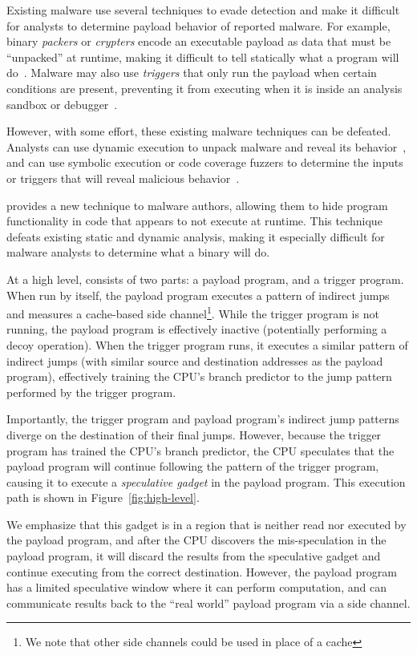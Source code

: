 Existing malware use several techniques to evade detection and
make it difficult for analysts to determine payload behavior of reported malware. 
For example, binary \emph{packers} or \emph{crypters} encode an executable payload as
data that must be ``unpacked'' at runtime, making it difficult to tell
statically what a program will do~\cite{malware-packers}. Malware may also use
\emph{triggers} that only run the payload when certain conditions are present, preventing
it from executing when it is inside an analysis sandbox or 
debugger~\cite{balzarotti2010efficient,red-pill}.

However, with some effort, these existing malware techniques can be defeated.
Analysts can use
dynamic execution to unpack malware and reveal its
behavior~\cite{balzarotti2010efficient}, and can use symbolic execution or code
coverage fuzzers to determine the inputs or triggers that will reveal malicious
behavior~\cite{moser2007exploring,schwartz2010all,wang2017angr,egele2012survey}.


\speculake provides a new technique to malware authors, allowing them to hide
program functionality in code that appears to not execute at runtime. This technique
defeats existing static and dynamic analysis, making it especially difficult for
malware analysts to determine what a binary will do.


At a high level, \speculake consists of two parts: a payload program, and a
trigger program. When run by itself, the payload program executes a pattern of
indirect jumps and measures a cache-based side channel\footnote{We note that other
side channels could be used in place of a cache}. While the trigger program is
not running, the payload program is effectively inactive (potentially performing
a decoy operation). When the trigger program runs, it executes a similar
pattern of indirect jumps (with similar source and destination addresses as the
payload program), effectively training the CPU's branch predictor to the jump
pattern performed by the trigger program.

Importantly, the trigger program and payload program's indirect jump patterns
diverge on the destination of their final jumps. However, because the trigger
program has trained the CPU's branch predictor, the CPU speculates that the
payload program will continue following the pattern of the trigger program,
causing it to execute a \emph{speculative gadget} in the payload
program. This execution path is shown in Figure~\ref{fig:high-level}.

We emphasize that this gadget is in a region that is neither
read nor executed by the payload program, and after the CPU discovers the
mis-speculation in the payload program, it will discard the results from the
speculative gadget and continue executing from the correct destination. However,
the payload program has a limited speculative window where it can perform
computation, and can communicate results back to the ``real world'' payload 
program via a side channel.

